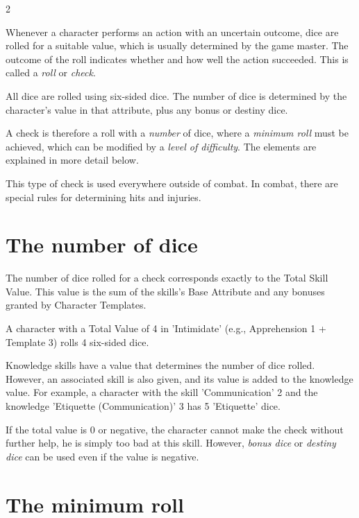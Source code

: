 \label{ch:rolls}

\begin{multicols}{2}

Whenever a character performs an action with an uncertain outcome, dice are rolled for a suitable value, which is usually determined by the game master. The outcome of the roll indicates whether and how well the action succeeded. This is called a \textit{roll} or \textit{check}.

All dice are rolled using six-sided dice. The number of dice is determined by the character's value in that attribute, plus any bonus or destiny dice.

A check is therefore a roll with a \textit{number} of dice, where a \textit{minimum roll} must be achieved, which can be modified by a \textit{level of difficulty}. The elements are explained in more detail below.

This type of check is used everywhere outside of combat. In combat, there are special rules for determining hits and injuries.

\section{The number of dice}

The number of dice rolled for a check corresponds exactly to the Total Skill Value. This value is the sum of the skills's Base Attribute and any bonuses granted by Character Templates. 

\begin{pexample}[Example]
A character with a Total Value of 4 in 'Intimidate' (e.g., Apprehension 1 + Template 3) rolls 4 six-sided dice.
\end{pexample}

Knowledge skills have a value that determines the number of dice rolled. However, an associated skill is also given, and its value is added to the knowledge value. For example, a character with the skill 'Communication' 2 and the knowledge 'Etiquette (Communication)' 3 has 5 'Etiquette' dice.

If the total value is 0 or negative, the character cannot make the check without further help, he is simply too bad at this skill. However, \textit{bonus dice} or \textit{destiny dice} can be used even if the value is negative.

\section{The minimum roll}


\end{multicols}
